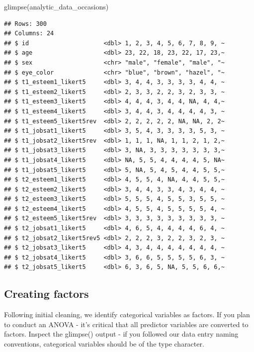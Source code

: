 \documentclass[
]{krantz}
\makeatletter
\newenvironment{Shaded}{\begin{snugshade}}{\end{snugshade}}
\newcommand{\FunctionTok}[1]{\textcolor[rgb]{0,0,0}{#1}}
\newcommand{\NormalTok}[1]{#1}
\newenvironment{kframe}{%
\medskip{}
\setlength{\fboxsep}{.8em}
 \def\at@end@of@kframe{}%
 \ifinner\ifhmode%
  \def\at@end@of@kframe{\end{minipage}}%
  \begin{minipage}{\columnwidth}%
 \fi\fi%
 \def\FrameCommand##1{\hskip\@totalleftmargin \hskip-\fboxsep
 \colorbox{shadecolor}{##1}\hskip-\fboxsep
     \hskip-\linewidth \hskip-\@totalleftmargin \hskip\columnwidth}%
 \MakeFramed {\advance\hsize-\width
   \@totalleftmargin\z@ \linewidth\hsize
   \@setminipage}}%
 {\par\unskip\endMakeFramed%
 \at@end@of@kframe}
\renewenvironment{Shaded}{\begin{kframe}}{\end{kframe}}
\makeatother
\begin{document}
\begin{Shaded}
\begin{Highlighting}[]
\FunctionTok{glimpse}\NormalTok{(analytic\_data\_occasions)}
\end{Highlighting}
\end{Shaded}

\begin{verbatim}
## Rows: 300
## Columns: 24
## $ id                     <dbl> 1, 2, 3, 4, 5, 6, 7, 8, 9, ~
## $ age                    <dbl> 23, 22, 18, 23, 22, 17, 23,~
## $ sex                    <chr> "male", "female", "male", "~
## $ eye_color              <chr> "blue", "brown", "hazel", "~
## $ t1_esteem1_likert5     <dbl> 3, 4, 4, 3, 3, 3, 3, 4, 4, ~
## $ t1_esteem2_likert5     <dbl> 2, 3, 3, 2, 2, 3, 2, 3, 3, ~
## $ t1_esteem3_likert5     <dbl> 4, 4, 4, 3, 4, 4, NA, 4, 4,~
## $ t1_esteem4_likert5     <dbl> 3, 4, 4, 3, 4, 4, 4, 4, 3, ~
## $ t1_esteem5_likert5rev  <dbl> 2, 2, 2, 2, 2, NA, NA, 2, 2~
## $ t1_jobsat1_likert5     <dbl> 3, 5, 4, 3, 3, 3, 3, 5, 3, ~
## $ t1_jobsat2_likert5rev  <dbl> 1, 1, 1, NA, 1, 1, 2, 1, 2,~
## $ t1_jobsat3_likert5     <dbl> 3, NA, 3, 3, 3, 3, 3, 3, 3,~
## $ t1_jobsat4_likert5     <dbl> NA, 5, 5, 4, 4, 4, 4, 5, NA~
## $ t1_jobsat5_likert5     <dbl> 5, NA, 5, 4, 5, 4, 4, 5, 5,~
## $ t2_esteem1_likert5     <dbl> 4, 5, 5, 4, NA, 4, 4, 5, 5,~
## $ t2_esteem2_likert5     <dbl> 3, 4, 4, 3, 3, 4, 3, 4, 4, ~
## $ t2_esteem3_likert5     <dbl> 5, 5, 5, 4, 5, 5, 3, 5, 5, ~
## $ t2_esteem4_likert5     <dbl> 4, 5, 5, 4, 5, 5, 5, 5, 4, ~
## $ t2_esteem5_likert5rev  <dbl> 3, 3, 3, 3, 3, 3, 3, 3, 3, ~
## $ t2_jobsat1_likert5     <dbl> 4, 6, 5, 4, 4, 4, 4, 6, 4, ~
## $ t2_jobsat2_likert5rev5 <dbl> 2, 2, 2, 3, 2, 2, 3, 2, 3, ~
## $ t2_jobsat3_likert5     <dbl> 4, 3, 4, 4, 4, 4, 4, 4, 4, ~
## $ t2_jobsat4_likert5     <dbl> 3, 6, 6, 5, 5, 5, 5, 6, 3, ~
## $ t2_jobsat5_likert5     <dbl> 6, 3, 6, 5, NA, 5, 5, 6, 6,~
\end{verbatim}

\hypertarget{creating-factors-6}{%
\subsection{Creating factors}\label{creating-factors-6}}

Following initial cleaning, we identify categorical variables as factors. If you plan to conduct an ANOVA - it's critical that all predictor variables are converted to factors. Inspect the glimpse() output - if you followed our data entry naming conventions, categorical variables should be of the type character.
\end{document}
